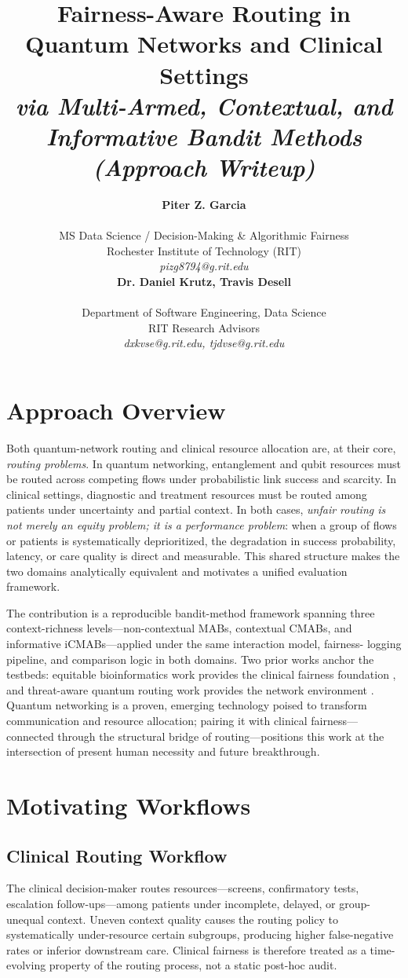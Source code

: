 \documentclass{IEEEtran}
\title{Fairness-Aware Routing in Quantum Networks and Clinical Settings\\[0.3em]
{\large\textit{via Multi-Armed, Contextual, and Informative Bandit Methods}}\\[0.3em]
{\large\textit{(Approach Writeup)}}}
\author{%
\begin{minipage}{0.48\textwidth}
\begin{center}
{\bf Piter Z. Garcia}\\
\begin{small}
MS Data Science / Decision-Making \& Algorithmic Fairness\\
Rochester Institute of Technology (RIT)\\
{\it pizg8794@g.rit.edu}
\end{small}
\end{center}
\end{minipage}
\hfill
\begin{minipage}{0.48\textwidth}
\begin{center}
{\bf Dr. Daniel Krutz, Travis Desell}\\
\begin{small}
Department of Software Engineering, Data Science\\
RIT Research Advisors\\
{\it dxkvse@g.rit.edu, tjdvse@g.rit.edu}
\end{small}
\end{center}
\end{minipage}%
}
\begin{document}
\maketitle

\section{Approach Overview}

Both quantum-network routing and clinical resource allocation are, at their
core, \textit{routing problems}. In quantum networking, entanglement and
qubit resources must be routed across competing flows under probabilistic
link success and scarcity. In clinical settings, diagnostic and treatment
resources must be routed among patients under uncertainty and partial context.
In both cases, \textit{unfair routing is not merely an equity problem; it is
a performance problem}: when a group of flows or patients is systematically
deprioritized, the degradation in success probability, latency, or care
quality is direct and measurable. This shared structure makes the two domains
analytically equivalent and motivates a unified evaluation framework.

The contribution is a reproducible bandit-method framework spanning three
context-richness levels---non-contextual MABs, contextual CMABs, and
informative iCMABs---applied under the same interaction model, fairness-
logging pipeline, and comparison logic in both domains. Two prior works
anchor the testbeds: equitable bioinformatics work provides the clinical
fairness foundation \cite{garcia2025equitable_bioinformatics}, and
threat-aware quantum routing work provides the network environment
\cite{garcia2026threat_aware_quantum_routing}. Quantum networking is a
proven, emerging technology poised to transform communication and resource
allocation; pairing it with clinical fairness---connected through the
structural bridge of routing---positions this work at the intersection of
present human necessity and future breakthrough.

\section{Motivating Workflows}

\subsection{Clinical Routing Workflow}
The clinical decision-maker routes resources---screens, confirmatory tests,
escalation follow-ups---among patients under incomplete, delayed, or
group-unequal context. Uneven context quality causes the routing policy to
systematically under-resource certain subgroups, producing higher
false-negative rates or inferior downstream care. Clinical fairness is
therefore treated as a time-evolving property of the routing process, not a
static post-hoc audit.
\end{document}
